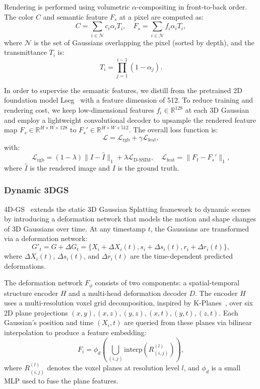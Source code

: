 Rendering is performed using volumetric \(\alpha\)-compositing in front-to-back order. The color \(C\) and semantic feature \(F_s\) at a pixel are computed as:
\begin{equation}
C = \sum_{i \in \mathcal{N}} c_i \alpha_i T_i, \quad
F_s = \sum_{i \in \mathcal{N}} f_i \alpha_i T_i,
\end{equation}
where \(\mathcal{N}\) is the set of Gaussians overlapping the pixel (sorted by depth), and the transmittance \(T_i\) is:
\begin{equation}
T_i = \prod_{j=1}^{i-1} (1 - \alpha_j).
\end{equation}

In order to supervise the semantic features, we distill from the pretrained 2D foundation model Lseg~\cite{Lseg} with a feature dimension of 512. To reduce training and rendering cost, we keep low-dimensional features \(f_i \in \mathbb{R}^{128}\) at each 3D Gaussian and employ a lightweight convolutional decoder to upsample the rendered feature map \(F_s \in \mathbb{R}^{H \times W \times 128}\) to \(F_s' \in \mathbb{R}^{H \times W \times 512}\).  The overall loss function is:
\begin{equation}
\mathcal{L} = \mathcal{L}_{\text{rgb}} + \gamma \mathcal{L}_{\text{feat}},
\end{equation}
with:
\[
\mathcal{L}_{\text{rgb}} = (1 - \lambda)\|I - \hat{I}\|_1 + \lambda \mathcal{L}_{\text{D-SSIM}}, \quad
\mathcal{L}_{\text{feat}} = \|F_t - F_s'\|_1,
\]
where \(\hat{I}\) is the rendered image and \(I\) is the ground truth.


\subsubsection{Dynamic 3DGS}

4D-GS~\cite{4dgs} extends the static 3D Gaussian Splatting framework to dynamic scenes by introducing a deformation network that models the motion and shape changes of 3D Gaussians over time. At any timestamp \(t\), the Gaussians are transformed via a deformation network:
\begin{equation}
G'_t = G + \Delta G_t = \{X_i + \Delta X_i(t), s_i + \Delta s_i(t), r_i + \Delta r_i(t)\},
\end{equation}
where \(\Delta X_i(t)\), \(\Delta s_i(t)\), and \(\Delta r_i(t)\) are the time-dependent predicted deformations.

The deformation network \(F_{\phi}\) consists of two components: a spatial-temporal structure encoder \(H\) and a multi-head deformation decoder \(D\). The encoder \(H\) uses a multi-resolution voxel grid decomposition, inspired by K-Planes~\cite{Kp}, over six 2D plane projections \((x,y), (x,z), (y,z), (x,t), (y,t), (z,t)\). Each Gaussian’s position and time \((X_i, t)\) are queried from these planes via bilinear interpolation to produce a feature embedding:
\begin{equation}
F_{i} = \phi_d\left(\bigcup_{(i,j)} \text{interp}(R_{(i,j)}^{(l)})\right),
\end{equation}
where \(R_{(i,j)}^{(l)}\) denotes the voxel planes at resolution level \(l\), and \(\phi_d\) is a small MLP used to fuse the plane features.


